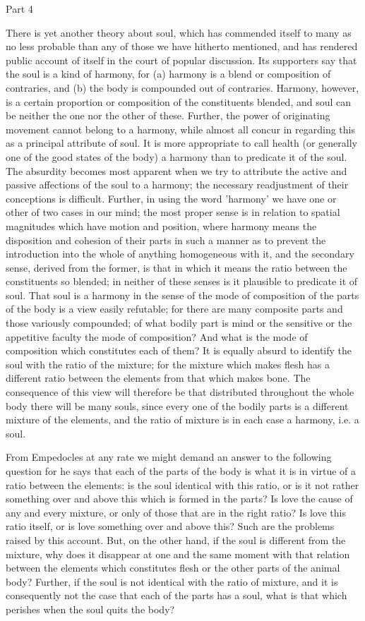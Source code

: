 Part 4

There is yet another theory about soul, which has commended itself
to many as no less probable than any of those we have hitherto mentioned,
and has rendered public account of itself in the court of popular
discussion. Its supporters say that the soul is a kind of harmony,
for (a) harmony is a blend or composition of contraries, and (b) the
body is compounded out of contraries. Harmony, however, is a certain
proportion or composition of the constituents blended, and soul can
be neither the one nor the other of these. Further, the power of originating
movement cannot belong to a harmony, while almost all concur in regarding
this as a principal attribute of soul. It is more appropriate to call
health (or generally one of the good states of the body) a harmony
than to predicate it of the soul. The absurdity becomes most apparent
when we try to attribute the active and passive affections of the
soul to a harmony; the necessary readjustment of their conceptions
is difficult. Further, in using the word 'harmony' we have one or
other of two cases in our mind; the most proper sense is in relation
to spatial magnitudes which have motion and position, where harmony
means the disposition and cohesion of their parts in such a manner
as to prevent the introduction into the whole of anything homogeneous
with it, and the secondary sense, derived from the former, is that
in which it means the ratio between the constituents so blended; in
neither of these senses is it plausible to predicate it of soul. That
soul is a harmony in the sense of the mode of composition of the parts
of the body is a view easily refutable; for there are many composite
parts and those variously compounded; of what bodily part is mind
or the sensitive or the appetitive faculty the mode of composition?
And what is the mode of composition which constitutes each of them?
It is equally absurd to identify the soul with the ratio of the mixture;
for the mixture which makes flesh has a different ratio between the
elements from that which makes bone. The consequence of this view
will therefore be that distributed throughout the whole body there
will be many souls, since every one of the bodily parts is a different
mixture of the elements, and the ratio of mixture is in each case
a harmony, i.e. a soul. 

From Empedocles at any rate we might demand an answer to the following
question for he says that each of the parts of the body is what it
is in virtue of a ratio between the elements: is the soul identical
with this ratio, or is it not rather something over and above this
which is formed in the parts? Is love the cause of any and every mixture,
or only of those that are in the right ratio? Is love this ratio itself,
or is love something over and above this? Such are the problems raised
by this account. But, on the other hand, if the soul is different
from the mixture, why does it disappear at one and the same moment
with that relation between the elements which constitutes flesh or
the other parts of the animal body? Further, if the soul is not identical
with the ratio of mixture, and it is consequently not the case that
each of the parts has a soul, what is that which perishes when the
soul quits the body? 

